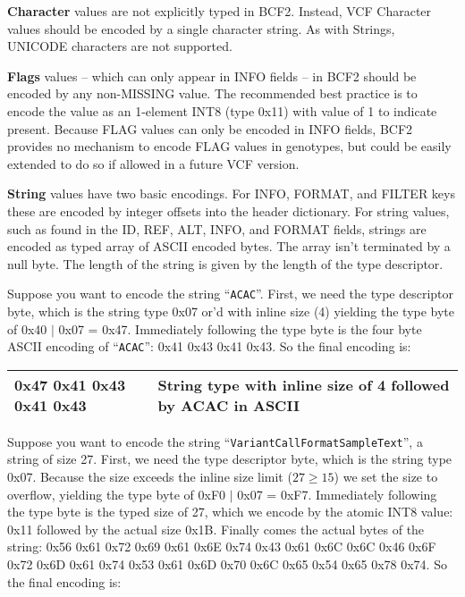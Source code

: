 \documentclass[8pt]{article}
\begin{document}
\vspace{0.3cm}
\textbf{Character} values are not explicitly typed in BCF2.  Instead, VCF Character values should be encoded by a single character string.  As with Strings, UNICODE characters are not supported.

\vspace{0.3cm}
\textbf{Flags} values -- which can only appear in INFO fields -- in BCF2 should be encoded by any non-MISSING value.  The recommended best practice is to encode the value as an 1-element INT8 (type 0x11) with value of 1 to indicate present.  Because FLAG values can only be encoded in INFO fields, BCF2 provides no mechanism to encode FLAG values in genotypes, but could be easily extended to do so if allowed in a future VCF version.

\vspace{0.3cm}
\textbf{String} values have two basic encodings.  For INFO, FORMAT, and FILTER keys these are encoded by integer offsets into the header dictionary.  For string values, such as found in the ID, REF, ALT, INFO, and FORMAT fields, strings are encoded as typed array of ASCII encoded bytes.  The array isn't terminated by a null byte.  The length of the string is given by the length of the type descriptor.

Suppose you want to encode the string ``{\tt ACAC}''.  First, we need the type descriptor byte, which is the string type 0x07 or'd with inline size (4) yielding the type byte of 0x40 $|$ 0x07 = 0x47.  Immediately following the type byte is the four byte ASCII encoding of ``{\tt ACAC}'': 0x41 0x43 0x41 0x43.  So the final encoding is:

\vspace{0.1cm}
\begin{tabular}{| l | l |} \hline
0x47 0x41 0x43 0x41 0x43 & String type with inline size of 4 followed by ACAC in ASCII \\ \hline
\end{tabular}
\vspace{0.3cm}

Suppose you want to encode the string ``{\tt VariantCallFormatSampleText}'', a string of size 27.  First, we need the type descriptor byte, which is the string type 0x07.  Because the size exceeds the inline size limit ($27 \geq 15$) we set the size to overflow, yielding the type byte of 0xF0 $|$ 0x07 = 0xF7.  Immediately following the type byte is the typed size of 27, which we encode by the atomic INT8 value: 0x11 followed by the actual size 0x1B.  Finally comes the actual bytes of the string: 0x56 0x61 0x72 0x69 0x61 0x6E 0x74 0x43 0x61 0x6C 0x6C 0x46 0x6F 0x72 0x6D 0x61 0x74 0x53 0x61 0x6D 0x70 0x6C 0x65 0x54 0x65 0x78 0x74.  So the final encoding is:
\end{document}
